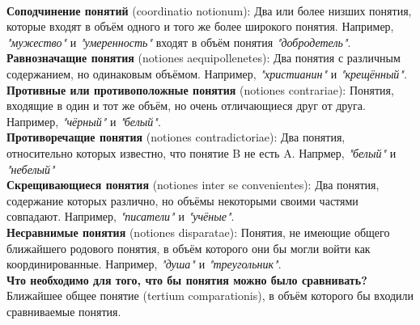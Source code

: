 \documentclass{article}
\begin{document}
\\
\textbf{Соподчинение понятий} (coordinatio notionum): Два или более низших понятия, которые входят в объём одного и того же более широкого понятия. Например, \textit{"мужество"} и \textit{"умеренность"} входят в объём понятия \textit{"добродетель"}.
\\
\textbf{Равнозначащие понятия} (notiones aequipollenetes): Два понятия с различным содержанием, но одинаковым объёмом. Например, \textit{"христианин"} и \textit{"крещённый"}.
\\
\textbf{Противные или противоположные понятия} (notiones contrariae): Понятия, входящие в один и тот же объём, но очень отличающиеся друг от друга. Например, \textit{"чёрный"} и \textit{"белый"}.
\\
\textbf{Противоречащие понятия} (notiones contradictoriae): Два понятия, относительно которых известно, что понятие B не есть A. Напрмер, \textit{"белый"} и \textit{"небелый"}
\\
\textbf{Скрещивающиеся понятия} (notiones inter se convenientes): Два понятия, содержание которых различно, но объёмы некоторыми своими частями совпадают. Например, \textit{"писатели"} и \textit{"учёные"}.
\\
\textbf{Несравнимые понятия} (notiones disparatae): Понятия, не имеющие общего ближайшего родового понятия, в объём которого они бы могли войти как координированные. Например, \textit{"душа"} и \textit{"треугольник"}.
\\
\textbf{Что необходимо для того, что бы понятия можно было сравнивать?} Ближайшее общее понятие (tertium comparationis), в объём которого бы входили сравниваемые понятия.
\end{document}
